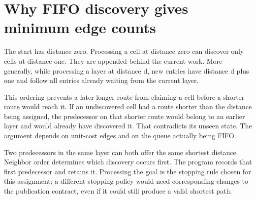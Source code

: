 \section{Why FIFO discovery gives minimum edge counts}\label{maze-p09}

The start has distance zero. Processing a cell at distance zero can discover only cells at distance one. They are appended behind the current work. More generally, while processing a layer at distance d, new entries have distance d plus one and follow all entries already waiting from the current layer.

This ordering prevents a later longer route from claiming a cell before a shorter route would reach it. If an undiscovered cell had a route shorter than the distance being assigned, the predecessor on that shorter route would belong to an earlier layer and would already have discovered it. That contradicts its unseen state. The argument depends on unit-cost edges and on the queue actually being FIFO.

Two predecessors in the same layer can both offer the same shortest distance. Neighbor order determines which discovery occurs first. The program records that first predecessor and retains it. Processing the goal is the stopping rule chosen for this assignment; a different stopping policy would need corresponding changes to the publication contract, even if it could still produce a valid shortest path.
